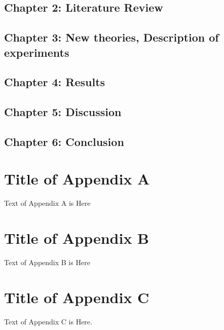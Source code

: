 \documentclass{article}
\begin{document}
	\subsection{Chapter 2: Literature Review}
	\subsection{Chapter 3: New theories, Description of experiments}
	\subsection{Chapter 4: Results}
	\subsection{Chapter 5: Discussion}
	\subsection{Chapter 6: Conclusion}
	
	
	
	

	\appendix
	\section{Title of Appendix A}

	Text of Appendix A is Here

	\section{Title of Appendix B}

	Text of Appendix B is Here
	
	\section{Title of Appendix C}
	
	Text of Appendix C is Here.
\end{document}
